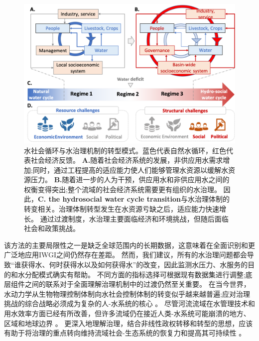 \begin{figure}[htbp!]
	\centering
	\includegraphics[width=\textwidth]{img/ch4/transition.png}
	\caption{
		水社会循环与水治理机制的转型模式。蓝色代表自然水循环，红色代表社会经济反馈。
        \textbf{A.}随着社会经济系统的发展，非供应用水需求增加;同时，通过工程提高的适应能力使人们能够管理水资源以缓解水资源压力。
        \textbf{B.}随着进一步的人为干预，供应用水和非供应用水之间的权衡变得突出;整个流域的社会经济系统需要更有组织的水治理。
        因此，\textbf{C. the hydrosocial water cycle transition}与水治理体制的转变相关。治理体制转型发生在水资源亏缺之后，适应能力快速增长。
        通过过渡制度，水治理主要面临经济和环境挑战，但随后面临社会和政策挑战。
	}
	\label{fig:summary}
\end{figure}


该方法的主要局限性之一是缺乏全球范围内的长期数据，这意味着在全面识别和更广泛地应用IWGI之间仍然存在差距。
然而，我们建议，所有的水治理问题都会导致“谁获得水、何时获得水以及如何获得水”的改变，因此监测水压力、水服务的目的和水分配模式确实有帮助。
不同方面的指标选择可根据现有数据集进行调整;底层组件之间的联系对于全面理解治理机制中的过渡仍然至关重要。
在当今世界，水动力学从生物物理控制体制向水社会控制体制的转变似乎越来越普遍;应对治理挑战的综合战略必须成为复杂的人-水系统的核心
\cite{cumming2018,cumming2014,jaeger2019}。
尽管河流流域在水管理技术和用水效率方面已经有所改善，但许多流域仍在接近人类-水系统可能崩溃的地方、区域和地球边界
\cite{gleeson2020, wang-erlandsson2022}。
更深入地理解治理，结合非线性政权转移和转型的思想，应该有助于将治理的重点转向维持流域社会-生态系统的恢复力和提高其可持续性
\cite{falkenmark2019}。

